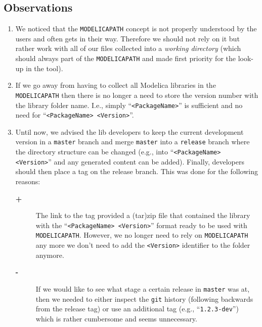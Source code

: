 \documentclass[11pt,a4paper,twocolumn]{article}
\newcommand{\code}[1]{\texttt{#1}} %
\begin{document}
\subsection{Observations}
\begin{enumerate}
\item We noticed that the \texttt{MODELICAPATH} concept is not
  properly understood by the users and often gets in their way.
  Therefore we should not rely on it but rather work with all of our
  files collected into a \emph{working directory} (which should always
  part of the \texttt{MODELICAPATH} and made first priority for the
  look-up in the tool).
\item If we go away from having to collect all Modelica libraries in
  the \texttt{MODELICAPATH} then there is no longer a need to store
  the version number with the library folder name.  I.e., simply
  ``\texttt{<PackageName>}'' is sufficient and no need for
  ``\texttt{<PackageName>~<Version>}''.

\item Until now, we advised the lib developers to keep the current
  development version in a \texttt{master} branch and merge
  \texttt{master} into a \texttt{release} branch where the directory
  structure can be changed (e.g., into ``\texttt{<PackageName>
    <Version>}'' and any generated content can be added).  Finally,
  developers should then place a tag on the release branch. This was
  done for the following reasons:
  \begin{description}
  \item[\textbf{+}] The link to the tag provided a (tar)zip file that
    contained the library with the
    ``\texttt{<PackageName>~<Version>}'' format ready to be used with
    \texttt{MODELICAPATH}. However, we no longer need to rely on
    \texttt{MODELICAPATH} any more we don't need to add the
    \texttt{<Version>} identifier to the folder anymore.
  \item[\textbf{-}] If we would like to see what stage a certain
    release in \texttt{master} was at, then we needed to either
    inspect the \code{git} history (following backwards from the
    release tag) or use an additional tag (e.g.,
    ``\texttt{1.2.3-dev}'') which is rather cumbersome and seems
    unnecessary.
  \end{description}
\end{enumerate}
\end{document}

